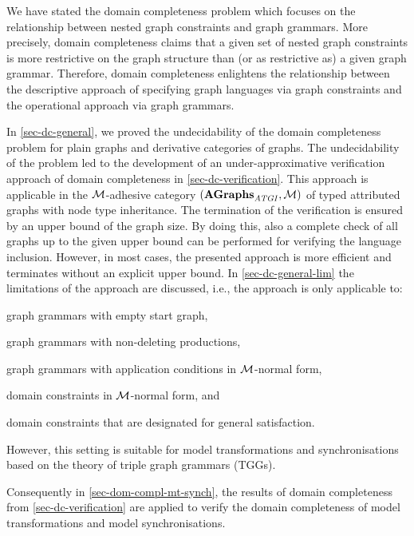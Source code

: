 We have stated the domain completeness problem which focuses on the relationship between nested graph constraints and graph grammars.
More precisely, domain completeness claims that a given set of nested graph constraints is more restrictive on the graph structure than (or as restrictive as) a given graph grammar.
Therefore, domain completeness enlightens the relationship between the descriptive approach of specifying graph languages via graph constraints and the operational approach via graph grammars.

In \cref{sec-dc-general}, we proved the undecidability of the domain completeness problem for plain graphs and derivative categories of graphs.
The undecidability of the problem led to the development of an under-approximative verification approach of domain completeness in \cref{sec-dc-verification}.
This approach is applicable in the ${\cal M}$-adhesive category $(\mathbf{AGraphs}_\mathit{ATGI},{\cal M})$ of typed attributed graphs with node type inheritance.
The termination of the verification is ensured by an upper bound of the graph size.
By doing this, also a complete check of all graphs up to the given upper bound can be performed for verifying the language inclusion.
However, in most cases, the presented approach is more efficient and terminates without an explicit upper bound.
In \cref{sec-dc-general-lim} the limitations of the approach are discussed, i.e., the approach is only applicable to:
%
\begin{enumerate*}
  \item graph grammars with empty start graph,
  \item graph grammars with non-deleting productions,
  \item graph grammars with application conditions in ${\cal M}$-normal form,
  \item domain constraints in ${\cal M}$-normal form, and
  \item domain constraints that are designated for general satisfaction.
\end{enumerate*}
%
However, this setting is suitable for model transformations and synchronisations based on the theory of triple graph grammars (TGGs).

Consequently in \cref{sec-dom-compl-mt-synch}, the results of domain completeness from \cref{sec-dc-verification} are applied to verify the domain completeness of model transformations and model synchronisations.
%

